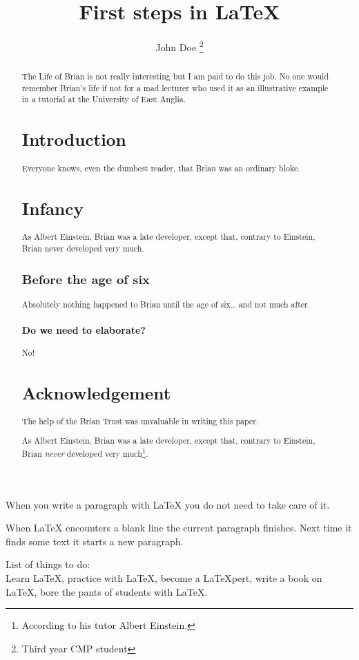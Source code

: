 \documentclass[12pt]{scrartcl}
\title{First steps in \LaTeX}
\author{John Doe
	\thanks{Third year CMP student}}
\begin{document}
	\maketitle
	\begin{abstract}
	The Life of Brian is not really interesting but I am
	paid to do this job. No one would remember Brian’s
	life if not for a mad lecturer who used it as an
	illustrative example in a tutorial at the University
	of East Anglia.
	\\
	\section{Introduction}
	Everyone knows, even the dumbest reader, that Brian was
	an ordinary bloke.
	\section{Infancy}
	As Albert Einstein, Brian was a late developer, except
	that, contrary to Einstein, Brian never developed very
	much.
	
	\subsection{Before the age of six}
	Absolutely nothing happened to Brian until the age of
	six\ldots{} and not much after.
	\subsubsection{Do we need to elaborate?}
	No!
	\section*{Acknowledgement}
	The help of the Brian Trust was unvaluable in writing
	this paper.
	
	As Albert Einstein, Brian was a late developer, except
	that, contrary to Einstein, Brian \emph{never} developed very
	much\footnote{According to his tutor Albert Einstein.}.
	\end{abstract}
	
	When you write a
	paragraph with \LaTeX{} you do not need to
take care of it.

When \LaTeX{} encounters a blank line
the current paragraph finishes.
Next time it finds some text it starts a new paragraph.

List of things to do:\\
Learn \LaTeX, practice with \LaTeX ,
become a \LaTeX{}pert,
write a book on \LaTeX ,
bore the pants of students with \LaTeX.
\end{document}
